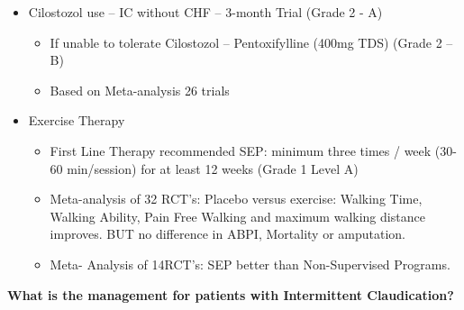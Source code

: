 \documentclass[
]{book}
\begin{document}
\begin{itemize}
\item
  Cilostozol use -- IC without CHF -- 3-month Trial (Grade 2 - A)

  \begin{itemize}
  \item
    If unable to tolerate Cilostozol -- Pentoxifylline (400mg TDS)
    (Grade 2 -- B)
  \item
    Based on Meta-analysis 26 trials
    \citep{stevensSystematicReviewEfficacy2012}
  \end{itemize}
\item
  Exercise Therapy

  \begin{itemize}
  \item
    First Line Therapy recommended SEP: minimum three times / week
    (30-60 min/session) for at least 12 weeks (Grade 1 Level A)
  \item
    Meta-analysis of 32 RCT's: Placebo versus exercise: Walking
    Time, Walking Ability, Pain Free Walking and maximum walking
    distance improves. BUT no difference in ABPI, Mortality or
    amputation. \citep{laneExerciseIntermittentClaudication2017}
  \item
    Meta- Analysis of 14RCT's: SEP better than Non-Supervised
    Programs. \citep{hagemanSupervisedExerciseTherapy2018}
  \end{itemize}
\end{itemize}

\textbf{What is the management for patients with Intermittent Claudication?}
\end{document}
